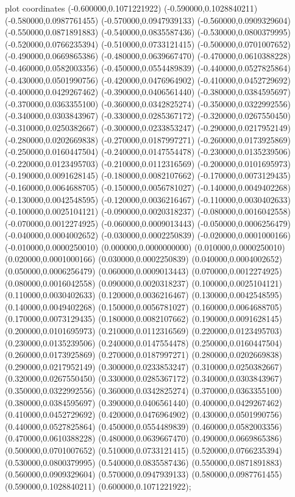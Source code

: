  plot coordinates {(-0.600000,0.1071221922) (-0.590000,0.1028840211) (-0.580000,0.0987761455) (-0.570000,0.0947939133) (-0.560000,0.0909329604) (-0.550000,0.0871891883) (-0.540000,0.0835587436) (-0.530000,0.0800379995) (-0.520000,0.0766235394) (-0.510000,0.0733121415) (-0.500000,0.0701007652) (-0.490000,0.0669865386) (-0.480000,0.0639667470) (-0.470000,0.0610388228) (-0.460000,0.0582003356) (-0.450000,0.0554489839) (-0.440000,0.0527825864) (-0.430000,0.0501990756) (-0.420000,0.0476964902) (-0.410000,0.0452729692) (-0.400000,0.0429267462) (-0.390000,0.0406561440) (-0.380000,0.0384595697) (-0.370000,0.0363355100) (-0.360000,0.0342825274) (-0.350000,0.0322992556) (-0.340000,0.0303843967) (-0.330000,0.0285367172) (-0.320000,0.0267550450) (-0.310000,0.0250382667) (-0.300000,0.0233853247) (-0.290000,0.0217952149) (-0.280000,0.0202669838) (-0.270000,0.0187997271) (-0.260000,0.0173925869) (-0.250000,0.0160447504) (-0.240000,0.0147554478) (-0.230000,0.0135239506) (-0.220000,0.0123495703) (-0.210000,0.0112316569) (-0.200000,0.0101695973) (-0.190000,0.0091628145) (-0.180000,0.0082107662) (-0.170000,0.0073129435) (-0.160000,0.0064688705) (-0.150000,0.0056781027) (-0.140000,0.0049402268) (-0.130000,0.0042548595) (-0.120000,0.0036216467) (-0.110000,0.0030402633) (-0.100000,0.0025104121) (-0.090000,0.0020318237) (-0.080000,0.0016042558) (-0.070000,0.0012274925) (-0.060000,0.0009013443) (-0.050000,0.0006256479) (-0.040000,0.0004002652) (-0.030000,0.0002250839) (-0.020000,0.0001000166) (-0.010000,0.0000250010) (0.000000,0.0000000000) (0.010000,0.0000250010) (0.020000,0.0001000166) (0.030000,0.0002250839) (0.040000,0.0004002652) (0.050000,0.0006256479) (0.060000,0.0009013443) (0.070000,0.0012274925) (0.080000,0.0016042558) (0.090000,0.0020318237) (0.100000,0.0025104121) (0.110000,0.0030402633) (0.120000,0.0036216467) (0.130000,0.0042548595) (0.140000,0.0049402268) (0.150000,0.0056781027) (0.160000,0.0064688705) (0.170000,0.0073129435) (0.180000,0.0082107662) (0.190000,0.0091628145) (0.200000,0.0101695973) (0.210000,0.0112316569) (0.220000,0.0123495703) (0.230000,0.0135239506) (0.240000,0.0147554478) (0.250000,0.0160447504) (0.260000,0.0173925869) (0.270000,0.0187997271) (0.280000,0.0202669838) (0.290000,0.0217952149) (0.300000,0.0233853247) (0.310000,0.0250382667) (0.320000,0.0267550450) (0.330000,0.0285367172) (0.340000,0.0303843967) (0.350000,0.0322992556) (0.360000,0.0342825274) (0.370000,0.0363355100) (0.380000,0.0384595697) (0.390000,0.0406561440) (0.400000,0.0429267462) (0.410000,0.0452729692) (0.420000,0.0476964902) (0.430000,0.0501990756) (0.440000,0.0527825864) (0.450000,0.0554489839) (0.460000,0.0582003356) (0.470000,0.0610388228) (0.480000,0.0639667470) (0.490000,0.0669865386) (0.500000,0.0701007652) (0.510000,0.0733121415) (0.520000,0.0766235394) (0.530000,0.0800379995) (0.540000,0.0835587436) (0.550000,0.0871891883) (0.560000,0.0909329604) (0.570000,0.0947939133) (0.580000,0.0987761455) (0.590000,0.1028840211) (0.600000,0.1071221922)};
